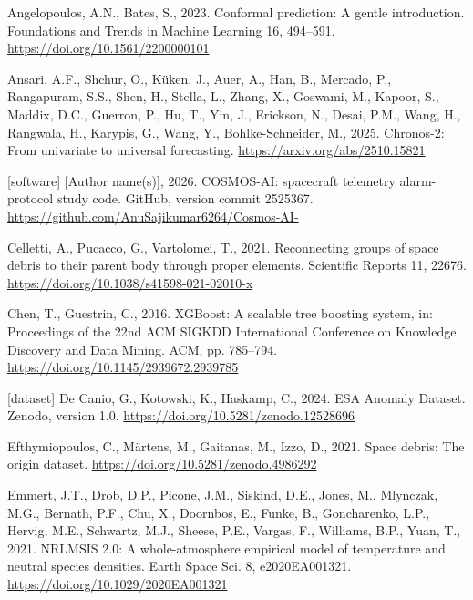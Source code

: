 \documentclass[
]{article}
\newlength{\cslhangindent}
\newenvironment{CSLReferences}[2] %
 {\begin{list}{}{%
  \setlength{\itemindent}{0pt}
  \setlength{\leftmargin}{0pt}
  \setlength{\parsep}{0pt}
  \ifodd #1
   \setlength{\leftmargin}{\cslhangindent}
   \setlength{\itemindent}{-1\cslhangindent}
  \fi
  \setlength{\itemsep}{#2\baselineskip}}}
 {\end{list}}
\begin{document}
\protect{}\label{refs}
\begin{CSLReferences}{1}{0}
Angelopoulos, A.N., Bates, S., 2023. Conformal prediction: A gentle
introduction. Foundations and Trends in Machine Learning 16, 494--591.
\url{https://doi.org/10.1561/2200000101}

Ansari, A.F., Shchur, O., Küken, J., Auer, A., Han, B., Mercado, P.,
Rangapuram, S.S., Shen, H., Stella, L., Zhang, X., Goswami, M., Kapoor,
S., Maddix, D.C., Guerron, P., Hu, T., Yin, J., Erickson, N., Desai,
P.M., Wang, H., Rangwala, H., Karypis, G., Wang, Y., Bohlke-Schneider,
M., 2025. {Chronos-2}: From univariate to universal forecasting.
\url{https://arxiv.org/abs/2510.15821}

{[}software{]} {[}Author name(s){]}, 2026. {COSMOS-AI: spacecraft
telemetry alarm-protocol study code}. GitHub, version commit 2525367.
\url{https://github.com/AnuSajikumar6264/Cosmos-AI-}

Celletti, A., Pucacco, G., Vartolomei, T., 2021. Reconnecting groups of
space debris to their parent body through proper elements. Scientific
Reports 11, 22676. \url{https://doi.org/10.1038/s41598-021-02010-x}

Chen, T., Guestrin, C., 2016. {XGBoost}: A scalable tree boosting
system, in: Proceedings of the 22nd {ACM SIGKDD} International
Conference on Knowledge Discovery and Data Mining. ACM, pp. 785--794.
\url{https://doi.org/10.1145/2939672.2939785}

{[}dataset{]} De Canio, G., Kotowski, K., Haskamp, C., 2024. {ESA
Anomaly Dataset}. Zenodo, version 1.0.
\url{https://doi.org/10.5281/zenodo.12528696}

Efthymiopoulos, C., Märtens, M., Gaitanas, M., Izzo, D., 2021. Space
debris: The origin dataset. \url{https://doi.org/10.5281/zenodo.4986292}

Emmert, J.T., Drob, D.P., Picone, J.M., Siskind, D.E., Jones, M.,
Mlynczak, M.G., Bernath, P.F., Chu, X., Doornbos, E., Funke, B.,
Goncharenko, L.P., Hervig, M.E., Schwartz, M.J., Sheese, P.E., Vargas,
F., Williams, B.P., Yuan, T., 2021. {NRLMSIS} 2.0: A whole-atmosphere
empirical model of temperature and neutral species densities. Earth
Space Sci. 8, e2020EA001321. \url{https://doi.org/10.1029/2020EA001321}


\end{CSLReferences}
\end{document}
